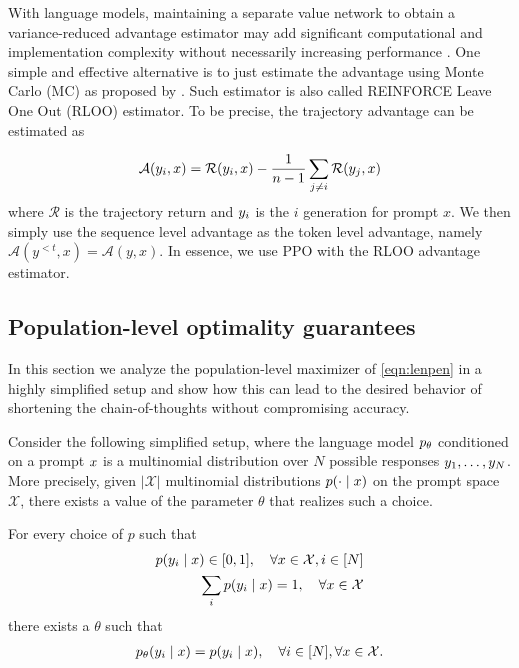With language models, maintaining a separate value network to obtain a variance-reduced advantage estimator  \cite{schulman2017proximalpolicyoptimizationalgorithms} may add significant computational and implementation complexity without necessarily increasing performance \cite{kool2019buy, ahmadian2024basicsrevisitingreinforcestyle}.
One simple and effective alternative is to just estimate the advantage using  Monte Carlo (MC) as proposed by \cite{kool2019buy, ahmadian2024basicsrevisitingreinforcestyle}. 
Such estimator is also called REINFORCE Leave One Out (RLOO) estimator. 
To be precise, the trajectory advantage can be estimated as

\[
\mathcal{A}(y_i, x)=\mathcal{R}(y_i, x) - \frac{1}{n-1}\sum_{j\neq i}\mathcal{R}(y_j, x)
\]
where $\mathcal{R}$ is the trajectory return and $y_i$ is the $i$ generation for prompt $x$.
We then simply use the sequence level advantage as the token level advantage, namely $\mathcal{A}(y^{<t}, x) = \mathcal{A}(y, x)$. In essence, we use PPO with the RLOO advantage estimator.

\subsection{Population-level optimality guarantees}
In this section we analyze the population-level maximizer of
\cref{eqn:lenpen} in a highly simplified setup and show how this can lead to the desired behavior of shortening the chain-of-thoughts without compromising accuracy.

Consider the following simplified setup, where the language model $p_\theta$ conditioned on a prompt $x{}$ is a multinomial distribution over $N$  possible responses $y_1,\dots, y_N$.
More precisely, given $|\mathcal X|$ multinomial distributions $p( \cdot \mid x{})$ on the prompt space $\mathcal X$, there exists a value of the parameter $\theta$ that realizes such a choice.
\begin{assumption}
\label{asm:realizability}
For every choice of $p$ such that
\begin{align}
  p(y_i \mid x{}) \in [0,1], \quad \forall x{} \in \mathcal X, i \in [N] \\
  \sum_i p(y_i \mid x{}) = 1, \quad \forall x{} \in \mathcal X
\end{align}
there exists a $\theta$ such that
\begin{align}
     p_\theta(y_i \mid x{}) = p(y_i \mid x{}), \quad \forall i \in [N], \forall x{} \in \mathcal X.
\end{align}
\end{assumption}

